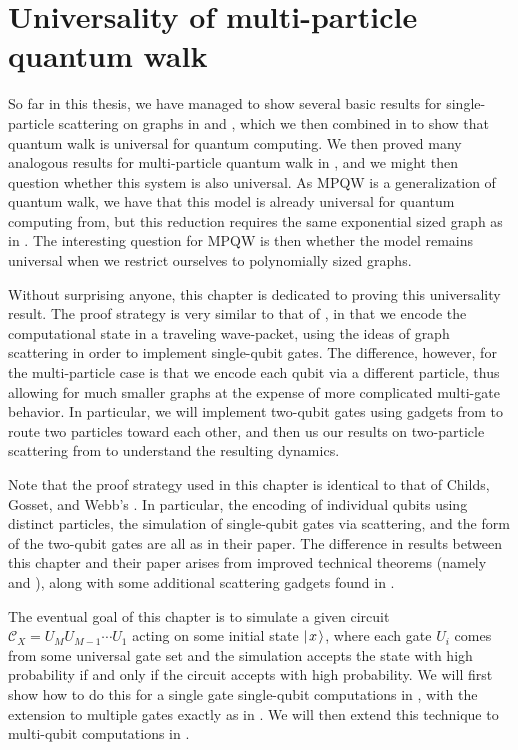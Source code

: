 \documentclass[../thesis-main/thesis-main]{subfiles}
\begin{document}
\chapter{Universality of multi-particle quantum walk}
\label{chap:MP_universality}

So far in this thesis, we have managed to show several basic results for single-particle scattering on graphs in  and , which we then combined in  to show that quantum walk is universal for quantum computing.  We then proved many analogous results for multi-particle quantum walk in , and we might then question whether this system is also universal.  As MPQW is a generalization of quantum walk, we have that this model is already universal for quantum computing from, but this reduction requires the  same exponential sized graph as in .  The interesting question for MPQW is then whether the model remains universal when we restrict ourselves to polynomially sized graphs.

Without surprising anyone, this chapter is dedicated to proving this universality result.  The proof strategy is very similar to that of , in that we encode the computational state in a traveling wave-packet, using the ideas of graph scattering in order to implement single-qubit gates.  The difference, however, for the multi-particle case is that we encode each qubit via a different particle, thus allowing for much smaller graphs at the expense of more complicated multi-gate behavior.  In particular, we will implement two-qubit gates using gadgets from  to route two particles toward each other, and then us our results on two-particle scattering from  to understand the resulting dynamics.

Note that the proof strategy used in this chapter is identical to that of Childs, Gosset, and Webb's \cite{MPQW}.  In particular, the encoding of individual qubits using distinct particles, the simulation of single-qubit gates via scattering, and the form of the two-qubit gates are all as in their paper.  The difference in results between this chapter and their paper arises from improved technical theorems (namely  and ), along with some additional scattering gadgets found in .  

The eventual goal of this chapter is to simulate a given circuit $\mathcal{C}_X = U_{M} U_{M-1}\cdots U_1$ acting on some initial state $|\mspace{2mu} x \mspace{2mu} \rangle$, where each gate $U_i$ comes from some universal gate set and the simulation accepts the state with high probability if and only if the circuit accepts with high probability.  We will first show how to do this for a single gate single-qubit computations in , with the extension to multiple gates exactly as in .  We will then extend this technique to multi-qubit computations in .
\end{document}
